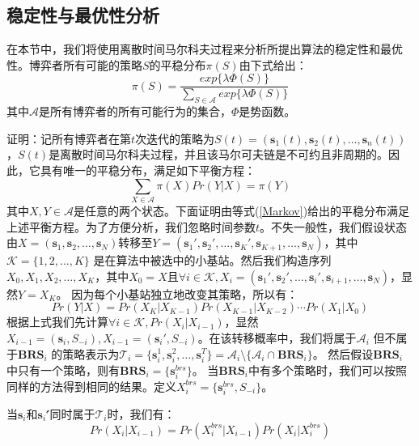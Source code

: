 \documentclass[bachelor]{seuthesis} %
\begin{document}
\begin{Main}
\subsection{稳定性与最优性分析}
在本节中，我们将使用离散时间马尔科夫过程来分析所提出算法的稳定性和最优性。博弈者所有可能的策略$S$的平稳分布$\pi(S)$由下式给出：
\begin{equation}\label{Markov}
\pi(S)=\frac{exp\{\lambda\Phi(S)\}}{\sum_{S\in\mathcal{A}}exp\{\lambda\Phi(S)\}}
\end{equation}
其中$\mathcal{A}$是所有博弈者的所有可能行为的集合，$\Phi$是势函数。\par
证明：记所有博弈者在第$t$次迭代的策略为$S(t)=(\textbf{s}_1(t),\textbf{s}_2(t),\dots,\textbf{s}_n(t))$，$S(t)$是离散时间马尔科夫过程，并且该马尔可夫链是不可约且非周期的。因此，它具有唯一的平稳分布，满足如下平衡方程：
\begin{equation}
\sum_{X\in\mathcal{A}}\pi(X)Pr(Y|X)=\pi(Y)
\end{equation}
其中$X,Y\in\mathcal{A}$是任意的两个状态。下面证明由等式(\ref{Markov})给出的平稳分布满足上述平衡方程。为了方便分析，我们忽略时间参数$t$。不失一般性，我们假设状态由$X=(\textbf{s}_1,\textbf{s}_2,\dots,\textbf{s}_N)$转移至$Y=(\textbf{s}_1',\textbf{s}_2',\dots,\textbf{s}_K',\textbf{s}_{K+1},\dots,\textbf{s}_N)$，其中$\mathcal{K}=\{1,2,\dots,K\}$ 是在算法中被选中的小基站。然后我们构造序列$ X_0,X_1,X_2,\dots,X_K$，其中$X_0=X$且$\forall i\in\mathcal{K},X_i=(\textbf{s}_1',\textbf{s}_2',\dots,\textbf{s}_i',\textbf{s}_{i+1},\dots,\textbf{s}_N)$，显然$Y=X_K$。 因为每个小基站独立地改变其策略，所以有：
\begin{equation}
Pr(Y|X)=Pr(X_K|X_{K-1})Pr(X_{K-1}|X_{K-2})\cdots Pr(X_1|X_0)
\end{equation}
根据上式我们先计算$\forall i\in\mathcal{K},Pr(X_i|X_{i-1})$，显然$X_{i-1}=(\textbf{s}_i,S_{-i}),X_{i-1}=(\textbf{s}_i',S_{-i})$。在该转移概率中，我们将属于$\mathcal{A}_i$ 但不属于$\textbf{BRS}_i$ 的策略表示为$\mathcal{T}_i=\{\textbf{s}_i^1,\textbf{s}_i^2,\dots,\textbf{s}_i^T\}=\mathcal{A}_i\setminus\{\mathcal{A}_i\cap\textbf{BRS}_i\}$。 然后假设$\textbf{BRS}_i$ 中只有一个策略，则有$\textbf{BRS}_i=\{\textbf{s}_i^{brs}\}$。 当$\textbf{BRS}_i$中有多个策略时，我们可以按照同样的方法得到相同的结果。定义$X_i^{brs}=\{\textbf{s}_i^{brs},S_{-i}\}$。\par
当$\textbf{s}_i$和$\textbf{s}_i'$́同时属于$\mathcal{T}_i$时，我们有：
\begin{equation}
Pr(X_i|X_{i-1})=Pr(X_i^{brs}|X_{i-1})Pr(X_i|X_i^{brs})
\end{equation}

\end{Main}
\end{document}
